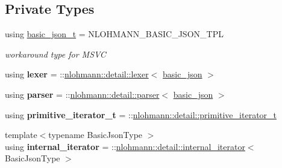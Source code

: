 \subsection*{Private Types}
\begin{DoxyCompactItemize}
\item 
\mbox{\label{classnlohmann_1_1basic__json_afff7860310ae69f29f8158a77ec0ef13}} 
using \mbox{\hyperlink{classnlohmann_1_1basic__json_afff7860310ae69f29f8158a77ec0ef13}{basic\+\_\+json\+\_\+t}} = N\+L\+O\+H\+M\+A\+N\+N\+\_\+\+B\+A\+S\+I\+C\+\_\+\+J\+S\+O\+N\+\_\+\+T\+PL
\begin{DoxyCompactList}\small\item\em workaround type for M\+S\+VC \end{DoxyCompactList}\item 
\mbox{\label{classnlohmann_1_1basic__json_a163540181fa07868de2902ecdb6df2ae}} 
using {\bfseries lexer} = \+::\mbox{\hyperlink{classnlohmann_1_1detail_1_1lexer}{nlohmann\+::detail\+::lexer}}$<$ \mbox{\hyperlink{classnlohmann_1_1basic__json}{basic\+\_\+json}} $>$
\item 
\mbox{\label{classnlohmann_1_1basic__json_aba9704e82d18f8954f9925e26cec7a51}} 
using {\bfseries parser} = \+::\mbox{\hyperlink{classnlohmann_1_1detail_1_1parser}{nlohmann\+::detail\+::parser}}$<$ \mbox{\hyperlink{classnlohmann_1_1basic__json}{basic\+\_\+json}} $>$
\item 
\mbox{\label{classnlohmann_1_1basic__json_a2b38de408edf89649e8bd3abcfdff038}} 
using {\bfseries primitive\+\_\+iterator\+\_\+t} = \+::\mbox{\hyperlink{classnlohmann_1_1detail_1_1primitive__iterator__t}{nlohmann\+::detail\+::primitive\+\_\+iterator\+\_\+t}}
\item 
\mbox{\label{classnlohmann_1_1basic__json_a3ce72c6254981a9d378ece3c9b15e96b}} 
{\footnotesize template$<$typename Basic\+Json\+Type $>$ }\\using {\bfseries internal\+\_\+iterator} = \+::\mbox{\hyperlink{structnlohmann_1_1detail_1_1internal__iterator}{nlohmann\+::detail\+::internal\+\_\+iterator}}$<$ Basic\+Json\+Type $>$
\item 
\mbox{\label{classnlohmann_1_1basic__json_abfd677a136936c16adf01e335f6a7a72}} 

\end{DoxyCompactItemize}
